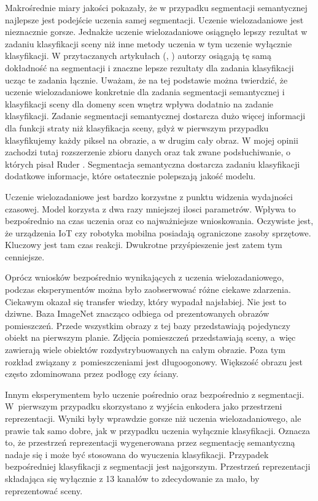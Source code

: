 Makrośrednie miary jakości pokazały, że w przypadku segmentacji semantycznej najlepsze jest podejście uczenia samej segmentacji. Uczenie wielozadaniowe jest nieznacznie gorsze. Jednakże uczenie wielozadaniowe osiągnęło lepszy rezultat w zadaniu klasyfikacji sceny niż inne metody uczenia w tym uczenie wyłącznie klasyfikacji. W przytaczanych artykułach (\cite{mehta2018net}, \cite{9892852}) autorzy osiągają tę samą dokładność na segmentacji i znaczne lepsze rezultaty dla zadania klasyfikacji ucząc te zadania łącznie. Uważam, że na tej podstawie można twierdzić, że uczenie wielozadaniowe konkretnie dla zadania segmentacji semantycznej i klasyfikacji sceny dla domeny scen wnętrz wpływa dodatnio na zadanie klasyfikacji. Zadanie segmentacji semantycznej dostarcza dużo więcej informacji dla funkcji straty niż klasyfikacja sceny, gdyż w pierwszym przypadku klasyfikujemy każdy piksel na obrazie, a w drugim cały obraz. W mojej opinii zachodzi tutaj rozszerzenie zbioru danych oraz tak zwane podsłuchiwanie, o których pisał Ruder \cite{ruder2017overview}. Segmentacja semantyczna dostarcza zadaniu klasyfikacji dodatkowe informacje, które ostatecznie polepszają jakość modelu.

Uczenie wielozadaniowe jest bardzo korzystne z punktu widzenia wydajności czasowej. Model korzysta z dwa razy mniejszej ilosci parametrów. Wpływa to bezpośrednio na czas uczenia oraz co najważniejsze wnioskowania. Oczywiste jest, że urządzenia IoT czy robotyka mobilna posiadają ograniczone zasoby sprzętowe. Kluczowy jest tam czas reakcji. Dwukrotne przyśpieszenie jest zatem tym cenniejsze.

Oprócz wniosków bezpośrednio wynikających z uczenia wielozadaniowego, podczas eksperymentów można było zaobserwować różne ciekawe zdarzenia. Ciekawym okazał się transfer wiedzy, który wypadał najsłabiej. Nie jest to dziwne. Baza ImageNet znacząco odbiega od prezentowanych obrazów pomieszczeń. Przede wszystkim obrazy z tej bazy przedstawiają pojedynczy obiekt na pierwszym planie. Zdjęcia pomieszczeń przedstawiają sceny, a~więc zawierają wiele obiektów rozdystrybuowanych na całym obrazie. Poza tym rozkład związany z~pomieszczeniami jest długoogonowy. Większość obrazu jest często zdominowana przez podłogę czy ściany.

Innym eksperymentem było uczenie pośrednio oraz bezpośrednio z segmentacji. W~pierwszym przypadku skorzystano z wyjścia enkodera jako przestrzeni reprezentacji. Wyniki były wprawdzie gorsze niż uczenia wielozadaniowego, ale prawie tak samo dobre, jak w przypadku uczenia wyłącznie klasyfikacji. Oznacza to, że przestrzeń reprezentacji wygenerowana przez segmentację semantyczną nadaje się i może być stosowana do wyuczenia klasyfikacji. Przypadek bezpośredniej klasyfikacji z segmentacji jest najgorszym. Przestrzeń reprezentacji składająca się wyłącznie z 13 kanałów to zdecydowanie za mało, by reprezentować sceny.

